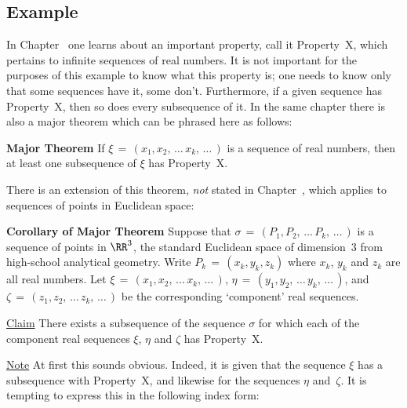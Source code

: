 \V

        \subsection{\small{{\bf Example}}}
        \label{ExampA40.42B}

\V

        In Chapter~ one learns about an important property, call it Property~X, which pertains to infinite sequences of real numbers.
    It is not important for the purposes of this example to know what this property is; one needs to know only that some sequences have it, some don't.
    Furthermore, if a given sequence has Property~X, then so does every subsequence of it.
    In the same chapter there is also a major theorem which can be phrased here as follows:

\VA

        {\bf Major Theorem} If ${\xi} \,=\, (x_{1}, x_{2},\,{\ldots}\,x_{k},\,{\ldots}\,)$ is a sequence of real numbers,
    then at least one subsequence of ${\xi}$ has Property~X.

\VA

\noindent There is an extension of this theorem, {\em not} stated in Chapter~, which applies to sequences of points in Euclidean space:

\VA

        {\bf Corollary of Major Theorem} Suppose that ${\sigma} \,=\, (P_{1}, P_{2},\,{\ldots}\,P_{k},\,{\ldots}\,)$ is a sequence of points in ${\RR}^{3}$,
    the standard Euclidean space of dimension~$3$ from high-school analytical geometry.
    Write $P_{k} \,=\, (x_{k}, y_{k}, z_{k})$ where $x_{k}$, $y_{k}$ and $z_{k}$ are all real numbers.
    Let ${\xi} \,=\, (x_{1}, x_{2},\,{\ldots}\,x_{k},\,{\ldots}\,)$, ${\eta} \,=\, (y_{1}, y_{2},\,{\ldots}\,y_{k},\,{\ldots}\,)$,
    and ${\zeta} \,=\, (z_{1}, z_{2},\,{\ldots}\,z_{k},\,{\ldots}\,)$ be the corresponding `component' real sequences.

        \underline{Claim} There exists a subsequence of the sequence ${\sigma}$ for which
    each of the component real sequences ${\xi}$, ${\eta}$ and ${\zeta}$ has Property~X.

        \underline{Note} At first this sounds obvious. Indeed, it is given that the sequence ${\xi}$ has a subsequence with Property~X,
    and likewise for the sequences ${\eta}$ and~${\zeta}$. It is tempting to express this in the following index form:

\VA

